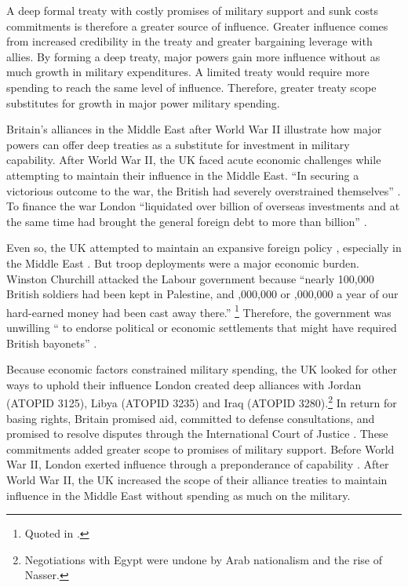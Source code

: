 \documentclass[12pt]{article}
\begin{document}
A deep formal treaty with costly promises of military support and sunk costs commitments is therefore a greater source of influence.
Greater influence comes from increased credibility in the treaty and greater bargaining leverage with allies.  
By forming a deep treaty, major powers gain more influence without as much growth in military expenditures. 
A limited treaty would require more spending to reach the same level of influence. 
Therefore, greater treaty scope substitutes for growth in major power military spending. 


Britain's alliances in the Middle East after World War II illustrate how major powers can offer deep treaties as a substitute for investment in military capability. 
After World War II, the UK faced acute economic challenges while attempting to maintain their influence in the Middle East. 
``In securing a victorious outcome to the war, the British had severely overstrained themselves'' \citep[pg. 367]{Kennedy1987}. 
To finance the war London ``liquidated over  billion of overseas investments and at the same time had brought the general foreign debt to more than  billion'' \citep[pg. 12]{Louis1984}.
 

Even so, the UK attempted to maintain an expansive foreign policy \citep{Mayhew1950}, especially in the Middle East \citep{Rahman1982}. 
But troop deployments were a major economic burden. 
Winston Churchill attacked the Labour government because ``nearly 100,000 British soldiers had been kept in Palestine, and ,000,000 or ,000,000 a year of our hard-earned money had been cast away there.''
\footnote{Quoted in \citet[pg. 11]{Louis1984}.}
Therefore, the government was unwilling `` to endorse political or economic settlements that might have required British bayonets'' \citep[pg. 15]{Louis1984}. 


Because economic factors constrained military spending, the UK looked for other ways to uphold their influence \citep{Monroe1963, Louis1984}
London created deep alliances with Jordan (ATOPID 3125), Libya (ATOPID 3235) and Iraq (ATOPID 3280).\footnote{Negotiations with Egypt were undone by Arab nationalism and the rise of Nasser.} 
In return for basing rights, Britain promised aid, committed to defense consultations, and promised to resolve disputes through the International Court of Justice \citep{Leedsetal2002}. 
These commitments added greater scope to promises of military support. 
Before World War II, London exerted influence through a preponderance of capability \citep{Monroe1963}.
After World War II, the UK increased the scope of their alliance treaties to maintain influence in the Middle East without spending as much on the military. 
\end{document}
